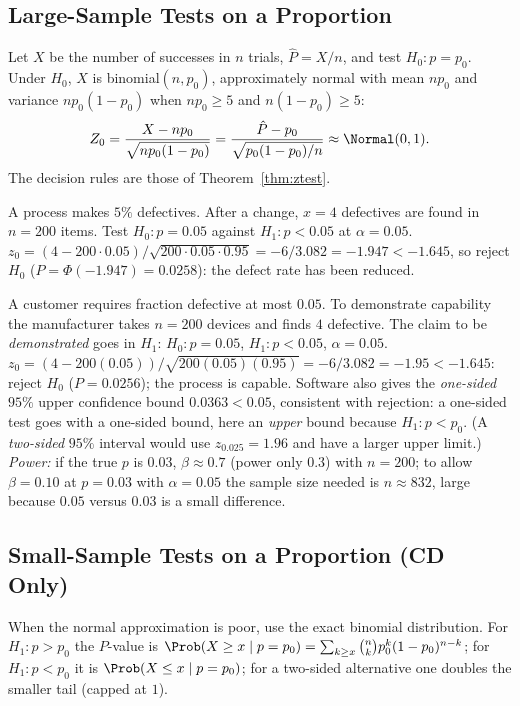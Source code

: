\subsection{Large-Sample Tests on a Proportion}

Let $X$ be the number of successes in $n$ trials, $\hat{P}=X/n$, and test $H_0:p=p_0$. Under $H_0$, $X$ is binomial$(n,p_0)$, approximately normal with mean $np_0$ and variance $np_0(1-p_0)$ when $np_0\ge5$ and $n(1-p_0)\ge5$:
\[ Z_0=\frac{X-np_0}{\sqrt{np_0(1-p_0)}}=\frac{\hat{P}-p_0}{\sqrt{p_0(1-p_0)/n}}\approx\Normal(0,1). \]
The decision rules are those of Theorem~\ref{thm:ztest}.

\begin{example}\label{ex:proptest}
A process makes $5\%$ defectives. After a change, $x=4$ defectives are found in $n=200$ items. Test $H_0:p=0.05$ against $H_1:p<0.05$ at $\alpha=0.05$. $z_0=(4-200\cdot0.05)/\sqrt{200\cdot0.05\cdot0.95}=-6/3.082=-1.947<-1.645$, so reject $H_0$ ($P=\Phi(-1.947)=0.0258$): the defect rate has been reduced.
\end{example}

\begin{example}
A customer requires fraction defective at most $0.05$. To demonstrate capability the manufacturer takes $n=200$ devices and finds $4$ defective. The claim to be \emph{demonstrated} goes in $H_1$: $H_0:p=0.05$, $H_1:p<0.05$, $\alpha=0.05$. $z_0=(4-200(0.05))/\sqrt{200(0.05)(0.95)}=-6/3.082=-1.95<-1.645$: reject $H_0$ ($P=0.0256$); the process is capable. Software also gives the \emph{one-sided} $95\%$ upper confidence bound $0.0363<0.05$, consistent with rejection: a one-sided test goes with a one-sided bound, here an \emph{upper} bound because $H_1:p<p_0$. (A \emph{two-sided} $95\%$ interval would use $z_{0.025}=1.96$ and have a larger upper limit.) \emph{Power:} if the true $p$ is $0.03$, $\beta\approx0.7$ (power only $0.3$) with $n=200$; to allow $\beta=0.10$ at $p=0.03$ with $\alpha=0.05$ the sample size needed is $n\approx832$, large because $0.05$ versus $0.03$ is a small difference.
\end{example}

\subsection{Small-Sample Tests on a Proportion (CD Only)}

When the normal approximation is poor, use the exact binomial distribution. For $H_1:p>p_0$ the $P$-value is $\Prob(X\ge x\mid p=p_0)=\sum_{k\ge x}\binom nkp_0^k(1-p_0)^{n-k}$; for $H_1:p<p_0$ it is $\Prob(X\le x\mid p=p_0)$; for a two-sided alternative one doubles the smaller tail (capped at $1$).

